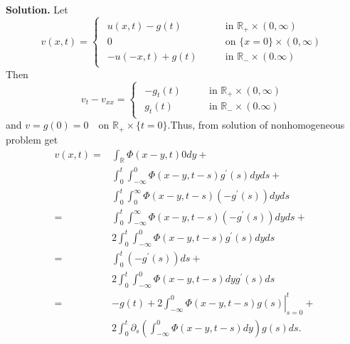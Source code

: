 \documentclass[a4paper]{book}
\newenvironment{solution}%
{\noindent\textbf{Solution.}}%
{\qedhere}
\numberwithin{equation}{chapter}
\theoremstyle{definition}
\begin{document}
\begin{multicols}{2}
\begin{solution}
	Let \begin{equation}\label{4:2:3}
		v(x,t) = \begin{cases}
		\begin{aligned}
		u(x,t) - g(t) &\qquad \text{in } \mathbb{R}_+ \times (0, \infty) \\
		0             &\qquad \text{on } \{x = 0\} \times (0, \infty) \\
		-u(-x,t) + g(t) &\qquad \text{in } \mathbb{R}_- \times (0. \infty) 
		\end{aligned}
		\end{cases}
	\end{equation}
	Then \begin{equation*}
	v_t - v_{xx} = 
		\begin{cases}
		\begin{aligned}
		-g_t(t) &\qquad \text{in } \mathbb{R}_+ \times (0, \infty) \\
		g_t(t) &\qquad \text{in } \mathbb{R}_- \times (0. \infty)
		\end{aligned}
		\end{cases}
	\end{equation*}
	and $ v = g(0) = 0 \quad \text{on } \mathbb{R}_+ \times \{t = 0\} $.Thus, from solution of nonhomogeneous problem get
	\begin{equation}
		\begin{aligned}
		v(x,t) =& \int_{\mathbb{R}} \Phi(x - y, t) 0 dy + \\
		&\int_{0}^{t}\int_{-\infty}^{0} \Phi(x-y, t-s)g^\prime(s)dyds + \\ 
		&\int_{0}^{t}\int_{0}^{\infty} \Phi(x-y, t-s)(-g^\prime(s))dyds\\
		=& \int_{0}^{t}\int_{-\infty}^{\infty} \Phi(x-y, t-s)(-g^\prime(s))dyds +\\
		&2\int_{0}^{t}\int_{-\infty}^{0} \Phi(x-y, t-s)g^\prime(s)dyds \\
		=& \int_{0}^{t} (-g^\prime(s))ds + \\
		&2\int_{0}^{t}\int_{-\infty}^{0} \Phi(x-y, t-s)dyg^\prime(s)ds \\
		=& -g(t) + 2\left. \int_{-\infty}^{0} \Phi(x-y, t-s)g(s)\right|^t_{s =0} + \\
		&2\int_{0}^{t} \partial_s (\int_{-\infty}^{0} \Phi(x-y, t-s)dy)g(s)ds. 
		\end{aligned}
	\end{equation} 

\end{solution}
\end{multicols}
\end{document}
